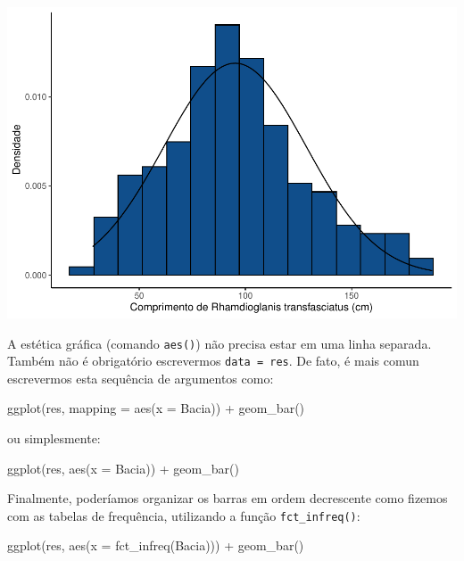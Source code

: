 \documentclass[
]{book}
\newenvironment{Shaded}{\begin{snugshade}}{\end{snugshade}}
\newcommand{\AttributeTok}[1]{\textcolor[rgb]{0.77,0.63,0.00}{#1}}
\newcommand{\FunctionTok}[1]{\textcolor[rgb]{0.00,0.00,0.00}{#1}}
\newcommand{\NormalTok}[1]{#1}
\newcommand{\SpecialCharTok}[1]{\textcolor[rgb]{0.00,0.00,0.00}{#1}}
\begin{document}
\includegraphics{probest-cambientais_files/figure-latex/unnamed-chunk-74-1.pdf}

A estética gráfica (comando \texttt{aes()}) não precisa estar em uma linha separada. Também não é obrigatório escrevermos \texttt{data\ =\ res}. De fato, é mais comun escrevermos esta sequência de argumentos como:

\begin{Shaded}
\begin{Highlighting}[]
\FunctionTok{ggplot}\NormalTok{(res, }\AttributeTok{mapping =} \FunctionTok{aes}\NormalTok{(}\AttributeTok{x =}\NormalTok{ Bacia)) }\SpecialCharTok{+}
  \FunctionTok{geom\_bar}\NormalTok{()}
\end{Highlighting}
\end{Shaded}

ou simplesmente:

\begin{Shaded}
\begin{Highlighting}[]
\FunctionTok{ggplot}\NormalTok{(res, }\FunctionTok{aes}\NormalTok{(}\AttributeTok{x =}\NormalTok{ Bacia)) }\SpecialCharTok{+}
  \FunctionTok{geom\_bar}\NormalTok{()}
\end{Highlighting}
\end{Shaded}

Finalmente, poderíamos organizar os barras em ordem decrescente como fizemos com as tabelas de frequência, utilizando a função \texttt{fct\_infreq()}:

\begin{Shaded}
\begin{Highlighting}[]
\FunctionTok{ggplot}\NormalTok{(res, }\FunctionTok{aes}\NormalTok{(}\AttributeTok{x =} \FunctionTok{fct\_infreq}\NormalTok{(Bacia))) }\SpecialCharTok{+}
  \FunctionTok{geom\_bar}\NormalTok{()}
\end{Highlighting}
\end{Shaded}
\end{document}
